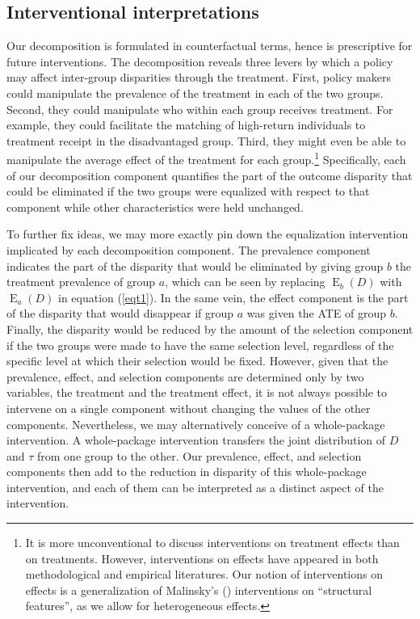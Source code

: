 \documentclass[12pt,a4paper]{article}
\newcommand{\E}{\operatorname{E}}
\begin{document}
\subsection{Interventional interpretations}
Our decomposition is formulated in counterfactual terms, hence is prescriptive for future interventions. The decomposition reveals three levers by which a policy may affect inter-group disparities through the treatment. First, policy makers could manipulate the prevalence of the treatment in each of the two groups. Second, they could manipulate who within each group receives treatment. For example, they could facilitate the matching of high-return individuals to treatment receipt in the disadvantaged group. Third, they might even be able to manipulate the average effect of the treatment for each group.\footnote{It is more unconventional to discuss interventions on treatment effects than on treatments. However, interventions on effects have appeared in both methodological \citep{malinsky_intervening_2018} and empirical \citep{brady_rethinking_2017} literatures.
Our notion of interventions on effects is a generalization of Malinsky's (\citeyear{malinsky_intervening_2018}) interventions on ``structural features'', as we allow for heterogeneous effects.} Specifically, each of our decomposition component quantifies the part of the outcome disparity that could be eliminated if the two groups were equalized with respect to that component while other characteristics were held unchanged.

To further fix ideas, we may more exactly pin down the equalization intervention implicated by each decomposition component. The prevalence component indicates the part of the disparity that would be eliminated by giving group $b$ the treatment prevalence of group $a$, which can be seen by replacing $\E_b(D)$ with $\E_a(D)$ in equation (\ref{eqt1}). In the same vein, the effect component is the part of the disparity that would disappear if group $a$ was given the ATE of group $b$. Finally, the disparity would be reduced by the amount of the selection component if the two groups were made to have the same selection level, regardless of the specific level at which their selection would be fixed. However, given that the prevalence, effect, and selection components are determined only by two variables, the treatment and the treatment effect, it is not always possible to intervene on a single component without changing the values of the other components. Nevertheless, we may alternatively conceive of a whole-package intervention. A whole-package intervention transfers the joint distribution of $D$ and $\tau$ from one group to the other. Our prevalence, effect, and selection components then add to the reduction in disparity of this whole-package intervention, and each of them can be interpreted as a distinct aspect of the intervention.
\end{document}

